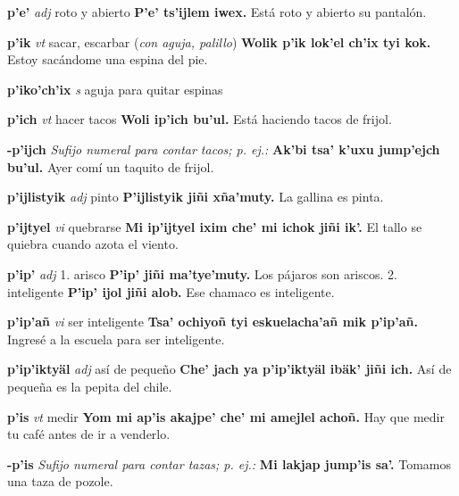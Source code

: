 \documentclass[10pt]{scrbook}
\newcommand{\entry}[1]{\textbf{#1}}
\newcommand{\onedefinition}[1]{#1.}
\newcommand{\nontranslationdef}[1]{\textit{#1}}
\newcommand{\partofspeech}[1]{\textit{#1}}
\newcommand{\spanishtranslation}[1]{#1}
\newcommand{\clarification}[1]{(\textit{#1})}
\newcommand{\cholexample}[1]{\textbf{#1}}
\newcommand{\exampletranslation}[1]{#1}
\begin{document}
\begin{multicols}{2}
\entry{p'e'}
\partofspeech{adj}
\spanishtranslation{roto y abierto}
\cholexample{P'e' ts'ijlem iwex.}
\exampletranslation{Está roto y abierto su pantalón.}

\entry{p'ik}
\partofspeech{vt}
\spanishtranslation{sacar, escarbar}
\clarification{con aguja, palillo}
\cholexample{Wolik p'ik lok'el ch'ix tyi kok.}
\exampletranslation{Estoy sacándome una espina del pie.}

\entry{p'iko'ch'ix}
\partofspeech{s}
\spanishtranslation{aguja para quitar espinas}

\entry{p'ich}
\partofspeech{vt}
\spanishtranslation{hacer tacos}
\cholexample{Woli ip'ich bu'ul.}
\exampletranslation{Está haciendo tacos de frijol.}

\entry{-p'ijch}
\nontranslationdef{Sufijo numeral para contar tacos; p. ej.:}
\cholexample{Ak'bi tsa' k'uxu jump'ejch bu'ul.}
\exampletranslation{Ayer comí un taquito de frijol.}

\entry{p'ijlistyik}
\partofspeech{adj}
\spanishtranslation{pinto}
\cholexample{P'ijlistyik jiñi xña'muty.}
\exampletranslation{La gallina es pinta.}

\entry{p'ijtyel}
\partofspeech{vi}
\spanishtranslation{quebrarse}
\cholexample{Mi ip'ijtyel ixim che' mi ichok jiñi ik'.}
\exampletranslation{El tallo se quiebra cuando azota el viento.}

\entry{p'ip'}
\partofspeech{adj}
\onedefinition{1}
\spanishtranslation{arisco}
\cholexample{P'ip' jiñi ma'tye'muty.}
\exampletranslation{Los pájaros son ariscos.}
\onedefinition{2}
\spanishtranslation{inteligente}
\cholexample{P'ip' ijol jiñi alob.}
\exampletranslation{Ese chamaco es inteligente.}

\entry{p'ip'añ}
\partofspeech{vi}
\spanishtranslation{ser inteligente}
\cholexample{Tsa' ochiyoñ tyi eskuelacha'añ mik p'ip'añ.}
\exampletranslation{Ingresé a la escuela para ser inteligente.}

\entry{p'ip'iktyäl}
\partofspeech{adj}
\spanishtranslation{así de pequeño}
\cholexample{Che' jach ya p'ip'iktyäl ibäk' jiñi ich.}
\exampletranslation{Así de pequeña es la pepita del chile.}

\entry{p'is}
\partofspeech{vt}
\spanishtranslation{medir}
\cholexample{Yom mi ap'is akajpe' che' mi amejlel achoñ.}
\exampletranslation{Hay que medir tu café antes de ir a venderlo.}

\entry{-p'is}
\nontranslationdef{Sufijo numeral para contar tazas; p. ej.:}
\cholexample{Mi lakjap jump'is sa'.}
\exampletranslation{Tomamos una taza de pozole.}


\end{multicols}
\end{document}
